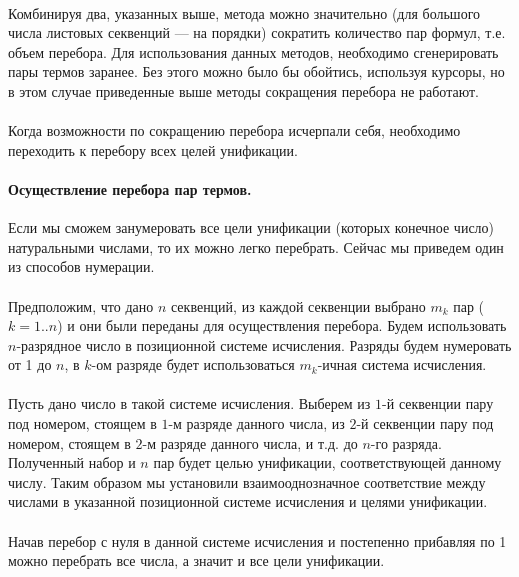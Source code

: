 \documentclass{cw1}
\begin{document}
\paragraph{}
Комбинируя два, указанных выше, метода можно значительно (для большого числа листовых секвенций
--- на порядки) сократить количество пар формул, т.е. объем перебора. Для использования данных методов,
необходимо сгенерировать пары термов заранее.
Без этого можно было бы обойтись, используя курсоры, но в этом случае приведенные выше методы
сокращения перебора не работают.
\paragraph{}
Когда возможности по сокращению перебора исчерпали себя, необходимо переходить к перебору всех
целей унификации.

\paragraph{Осуществление перебора пар термов.}
Если мы сможем занумеровать все цели унификации (которых конечное число) натуральными числами,
то их можно легко перебрать. Сейчас мы приведем один из способов нумерации.
\paragraph{}
Предположим, что дано $n$ секвенций, из каждой секвенции выбрано $m_k$ пар ($k=1..n$) и они были
переданы для осуществления перебора.
Будем использовать $n$-разрядное число в позиционной системе исчисления. Разряды будем нумеровать
от 1 до $n$, в $k$-ом разряде будет использоваться $m_k$-ичная система исчисления.
\paragraph{}
Пусть дано число в такой системе исчисления. Выберем из $1$-й секвенции пару под номером, стоящем
в $1$-м разряде данного числа, из $2$-й секвенции пару под номером, стоящем
в $2$-м разряде данного числа, и т.д. до $n$-го разряда. Полученный набор и $n$ пар будет целью
унификации, соответствующей данному числу. Таким образом мы установили взаимооднозначное соответствие
между числами в указанной позиционной системе исчисления и целями унификации.
\paragraph{}
Начав перебор с нуля в данной системе исчисления и постепенно прибавляя по 1 можно перебрать все
числа, а значит и все цели унификации.
\end{document}
